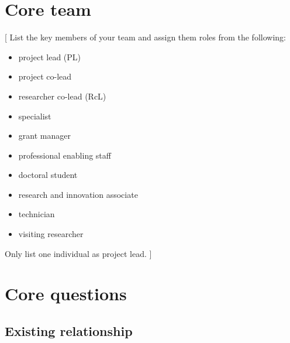 \documentclass{article}
\newcommand{\desc}[1]{{\leavevmode\color{blue}[#1]}}
\begin{document}
\section{Core team}
\desc{
List the key members of your team and assign them roles from the following:

\begin{itemize}
    \item project lead (PL)

    \item project co-lead

    \item researcher co-lead (RcL)

    \item specialist

    \item grant manager

    \item professional enabling staff

    \item doctoral student

    \item research and innovation associate

    \item technician

    \item visiting researcher
\end{itemize}

Only list one individual as project lead.
}

% 

\section{Core questions}

\subsection{Existing relationship}
\end{document}
